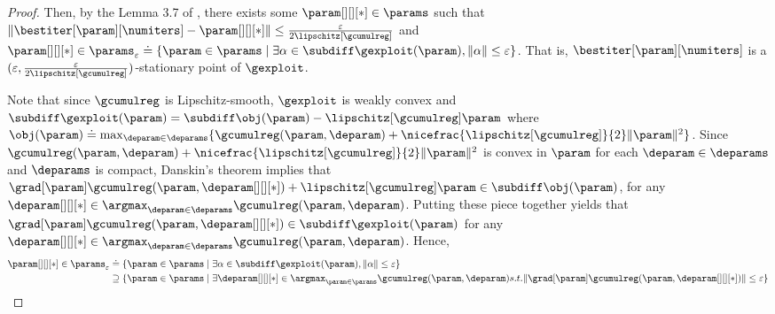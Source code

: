 \begin{proof}
    Then, by the Lemma 3.7 of \cite{lin2020gradient}, there exists some $\param[][][*]\in \params$ such that $\|\bestiter[{\param}][\numiters]-\param[][][*]\|\leq \frac{\varepsilon}{2\lipschitz[\gcumulreg]}$ and $\param[][][*]\in \params_\varepsilon\doteq\{\param\in \params\mid \exists \alpha\in \subdiff\gexploit(\param), \|\alpha\|\leq \varepsilon\}$. 
    That is, $\bestiter[{\param}][\numiters]$ is a $(\varepsilon, \frac{\varepsilon}{2\lipschitz[\gcumulreg]})$-stationary point of $\gexploit$.

    Note that since $\gcumulreg$ is Lipschitz-smooth, $\gexploit$ is weakly convex and $\subdiff\gexploit(\param)=\subdiff \obj(\param) - \lipschitz[\gcumulreg] \param$ where $\obj(\param) \doteq \max_{\deparam\in \deparams}\{\gcumulreg(\param, \deparam) + \nicefrac{\lipschitz[\gcumulreg]}{2}\|\param\|^2\}$. Since  $\gcumulreg(\param, \deparam) + \nicefrac{\lipschitz[\gcumulreg]}{2}\|\param\|^2$ is convex in $\param$ for each $\deparam\in \deparams$ and $\deparams$ is compact, Danskin's theorem implies that $\grad[\param]\gcumulreg(\param, \deparam[][][*]) + \lipschitz[\gcumulreg]\param \in \subdiff \obj(\param)$, for any $\deparam[][][*]\in \argmax_{\deparam\in \deparams}\gcumulreg(\param, \deparam)$. Putting these piece together yields that $\grad[\param]\gcumulreg(\param, \deparam[][][*])\in \subdiff \gexploit(\param)$ for any $\deparam[][][*]\in \argmax_{\deparam\in \deparams}\gcumulreg(\param, \deparam)$. Hence, 
    \begin{align}
        \param[][][*]\in \params_\varepsilon
        &\doteq\{\param\in \params\mid \exists \alpha\in \subdiff\gexploit(\param), \|\alpha\|\leq \varepsilon\}\\
        &\supseteq\{\param\in \params\mid \exists \deparam[][][*]\in \argmax_{\param\in \params}\gcumulreg(\param, \deparam) s.t. \|\grad[\param]\gcumulreg(\param, \deparam[][][*])\|\leq \varepsilon \}
    \end{align}
    \fi


\end{proof}
